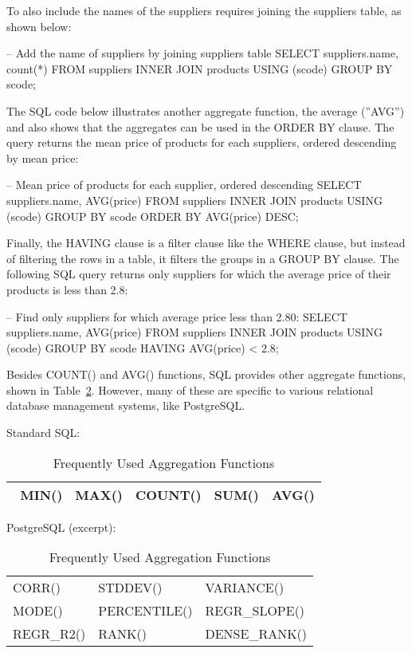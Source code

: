To also include the names of the suppliers requires joining the suppliers table, as shown below:
\begin{sqlcode}
-- Add the name of suppliers by joining suppliers table
SELECT suppliers.name, count(*)
    FROM suppliers INNER JOIN products USING (scode)
    GROUP BY scode;
\end{sqlcode}

The SQL code below illustrates another aggregate function, the average (''AVG'') and also shows that the aggregates can be used in the ORDER BY clause. The query returns the mean price of products for each suppliers, ordered descending by mean price:

\begin{sqlcode}
-- Mean price of products for each supplier, ordered descending
SELECT suppliers.name, AVG(price)
    FROM suppliers INNER JOIN products USING (scode)
    GROUP BY scode
    ORDER BY AVG(price) DESC;
\end{sqlcode}

Finally, the HAVING clause is a filter clause like the WHERE clause, but instead of filtering the rows in a table, it filters the groups in a GROUP BY clause. The following SQL query returns only suppliers for which the average price of their products is less than 2.8:

\begin{sqlcode}
-- Find only suppliers for which average price less than 2.80:
SELECT suppliers.name, AVG(price)
    FROM suppliers INNER JOIN products USING (scode)
    GROUP BY scode
    HAVING AVG(price) < 2.8;
\end{sqlcode}

Besides COUNT() and AVG() functions, SQL provides other aggregate functions, shown in Table~\ref{tab:sqlaggregates}. However, many of these are specific to various relational database management systems, like PostgreSQL. 

\begin{table}
\centering

\renewcommand{\arraystretch}{1.5}
Standard SQL: \\

\small
\begin{tabular}{l|l|l|l|l} \hline
\
MIN() & MAX() & COUNT() & SUM() & AVG() \\ \hline
\end{tabular}

\normalsize

\vspace{\baselineskip}
PostgreSQL (excerpt):\\

\small
\begin{tabular}{l|l|l} \hline
CORR() & STDDEV() & VARIANCE() \\
MODE() & PERCENTILE() & REGR\_SLOPE() \\
REGR\_R2() & RANK() & DENSE\_RANK() \\ \hline
\end{tabular}

\caption{Frequently Used Aggregation Functions}
\label{tab:sqlaggregates}
\end{table}

